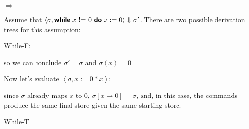 \documentclass[11pt]{article}
\begin{document}
\begin{exercise}
\begin{enumerate}
$\Rightarrow$

Assume that $\left<\sigma, \while{x~\mathord{!}\mathord{=}~0}{x := 0}\right> \Downarrow \sigma'$. There are two possible derivation trees for this assumption:

\underline{While-F}:

\begin{prooftree}
\end{prooftree}

so we can conclude $\sigma' = \sigma$ and $\sigma(x) = 0$

Now let's evaluate $\left< \sigma, x:= 0 * x\right>$:

\begin{prooftree}
\end{prooftree}

since $\sigma$ already maps $x$ to 0, $\sigma[x \mapsto 0] = \sigma$, and, in this case, the commands produce the same final store given the same starting store.

\underline{While-T}
\footnotesize 
\begin{prooftree}
\end{prooftree}
\normalsize


\end{enumerate}
\end{exercise}
\end{document}
